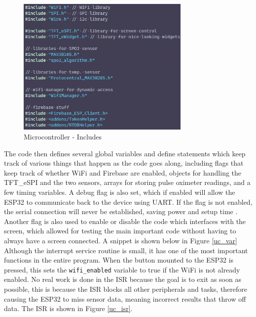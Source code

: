 \documentclass[12pt]{article}
\begin{document}
    \begin{figure}[hbt!]
        \centering
        \includegraphics[width=0.75\textwidth]{uc_libs}
        \caption{Microcontroller - Includes}
        \label{uc_lib}
    \end{figure} 

    The code then defines several global variables and define statements which keep track of various things that happen as the code goes along, including flags that keep track of whether WiFi and Firebase are enabled, objects for handling the TFT\_eSPI and the two sensors, arrays for storing pulse oximeter readings, and a few timing variables. A debug flag is also set, which if enabled will allow the ESP32 to communicate back to the device using UART. If the flag is not enabled, the serial connection will never be established, saving power and setup time \cite{esp32}. Another flag is also used to enable or disable the code which interfaces with the screen, which allowed for testing the main important code without having to always have a screen connected. A snippet is shown below in Figure \ref{uc_var} Although the interrupt service routine is small, it has one of the most important functions in the entire program. When the button mounted to the ESP32 is pressed, this sets the \verb|wifi_enabled| variable to true if the WiFi is not already enabled. No real work is done in the ISR because the goal is to exit as soon as possible, this is because the ISR blocks all other peripherals and tasks, therefore causing the ESP32 to miss sensor data, meaning incorrect results that throw off data. The ISR is shown in Figure \ref{uc_isr}.
\end{document}
